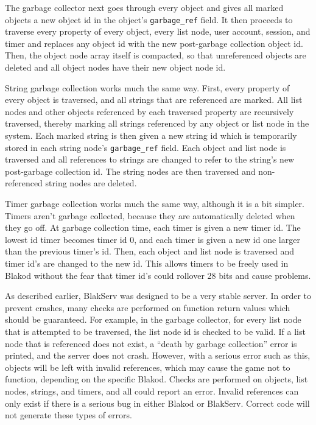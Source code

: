 The garbage collector next goes through every object and gives all marked objects
a new object id in the object's \texttt{garbage\_ref} field.  It then proceeds to
traverse every property of every object, every list node, user account, session,
and timer and replaces any object id with the new post-garbage collection object id.
Then, the object node array itself is compacted, so that unreferenced objects
are deleted and all object nodes have their new object node id.

String garbage collection works much the same way.  First, every property of every object
is traversed, and all strings that are referenced are marked.  All list nodes and
other objects referenced by each traversed property are recursively traversed,
thereby marking all strings referenced by any object or list node in the system.
Each marked string is then given a new string id which is temporarily stored in
each string node's \texttt{garbage\_ref} field.  Each object and list node is traversed
and all references to strings are changed to refer to the string's new post-garbage
collection id.  The string nodes are then traversed and non-referenced string nodes
are deleted.

Timer garbage collection works much the same way, although it is a bit simpler.  Timers
aren't garbage collected, because they are automatically deleted when they go off.  At
garbage collection time, each timer is given a new timer id.  The lowest id timer becomes
timer id 0, and each timer is given a new id one larger than the previous timer's id.  Then,
each object and list node is traversed and timer id's are changed to the new id.  This
allows timers to be freely used in Blakod without the fear that timer id's could rollover
28 bits and cause problems.

As described earlier, BlakServ was designed to be a very stable server.  In order
to prevent crashes, many checks are performed on function return values which
should be guaranteed.  For example, in the garbage collector, for every list
node that is attempted to be traversed, the list node id is checked to be valid.  
If a list node that is referenced does not exist, a ``death by garbage collection''
error is printed, and the server does not crash.  However, with a serious error
such as this, objects will be left with invalid references, which may cause
the game not to function, depending on the specific Blakod.  Checks are performed
on objects, list nodes, strings, and timers, and all could report an error.  Invalid
references can only exist if there is a serious bug in either Blakod or BlakServ.
Correct code will not generate these types of errors.



